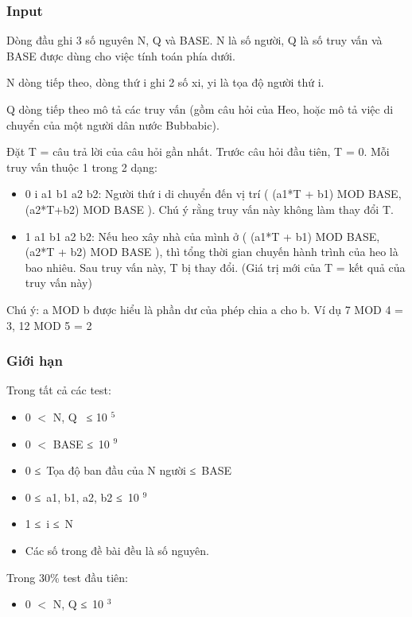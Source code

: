 \subsubsection{   Input  }

   Dòng đầu ghi 3 số nguyên N, Q và BASE. N là số người, Q là số truy vấn và BASE được dùng cho việc tính toán phía dưới.  

   N dòng tiếp theo, dòng thứ i ghi 2 số xi, yi là tọa độ người thứ i.  

   Q dòng tiếp theo mô tả các truy vấn (gồm câu hỏi của Heo, hoặc mô tả việc di chuyển của một người dân nước Bubbabic).  

   Đặt T = câu trả lời của câu hỏi gần nhất. Trước câu hỏi đầu tiên, T = 0. Mỗi truy vấn thuộc 1 trong 2 dạng:  
\begin{itemize}
	\item     0 i a1 b1 a2 b2: Người thứ i di chuyển đến vị trí ( (a1*T + b1) MOD BASE, (a2*T+b2) MOD BASE ). Chú ý rằng truy vấn này không làm thay đổi T.   
	\item     1 a1 b1 a2 b2: Nếu heo xây nhà của mình ở ( (a1*T + b1) MOD BASE, (a2*T + b2) MOD BASE ), thì tổng thời gian chuyến hành trình của heo là bao nhiêu. Sau truy vấn này, T bị thay đổi. (Giá trị mới của T = kết quả của truy vấn này)   
\end{itemize}

   Chú ý: a MOD b được hiểu là phần dư của phép chia a cho b. Ví dụ 7 MOD 4 = 3, 12 MOD 5 = 2  

\subsubsection{   Giới hạn  }

   Trong tất cả các test:  
\begin{itemize}
	\item     0 $<$ N, Q  ≤ 10    $^     5    $
	\item     0 $<$ BASE ≤ 10    $^     9    $
	\item     0 ≤ Tọa độ ban đầu của N người ≤ BASE   
	\item     0 ≤ a1, b1, a2, b2 ≤ 10    $^     9    $
	\item     1 ≤ i ≤ N   
	\item     Các số trong đề bài đều là số nguyên.   
\end{itemize}

   Trong 30\% test đầu tiên:  
\begin{itemize}
	\item     0 $<$ N, Q ≤ 10    $^     3    $
\end{itemize}

